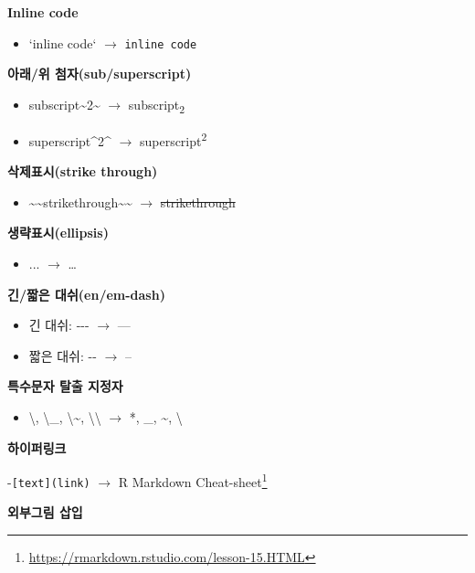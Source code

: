 \documentclass[
  11pt,
]{krantz}
\providecommand{\tightlist}{%
  \setlength{\itemsep}{0pt}\setlength{\parskip}{0pt}}
\renewcommand{\href}[2]{#2\footnote{\url{#1}}}
\begin{document}
\textbf{Inline code}

\begin{itemize}
\tightlist
\item
  {`}inline code` \(\rightarrow\) \texttt{inline\ code}
\end{itemize}

\textbf{아래/위 첨자(sub/superscript)}

\begin{itemize}
\tightlist
\item
  subscript\textasciitilde2\textasciitilde{} \(\rightarrow\) subscript\textsubscript{2}
\item
  superscript\^{}2\^{} \(\rightarrow\) superscript\textsuperscript{2}
\end{itemize}

\textbf{삭제표시(strike through)}

\begin{itemize}
\tightlist
\item
  \textasciitilde\textasciitilde strikethrough\textasciitilde\textasciitilde{} \(\rightarrow\) \sout{strikethrough}
\end{itemize}

\textbf{생략표시(ellipsis)}

\begin{itemize}
\tightlist
\item
  ... \(\rightarrow\) \ldots{}
\end{itemize}

\textbf{긴/짧은 대쉬(en/em-dash)}

\begin{itemize}
\tightlist
\item
  긴 대쉬: -\/-\/- \(\rightarrow\) ---
\item
  짧은 대쉬: -\/- \(\rightarrow\) --
\end{itemize}

\textbf{특수문자 탈출 지정자}

\begin{itemize}
\tightlist
\item
  \textbackslash*, \textbackslash\_, \textbackslash\textasciitilde, \textbackslash\textbackslash{} \(\rightarrow\) *, \_, \textasciitilde, \textbackslash{}
\end{itemize}

\textbf{하이퍼링크}

-\texttt{{[}text{]}(link)} \(\rightarrow\) \href{https://rmarkdown.rstudio.com/lesson-15.HTML}{R Markdown Cheat-sheet}

\textbf{외부그림 삽입}
\end{document}
